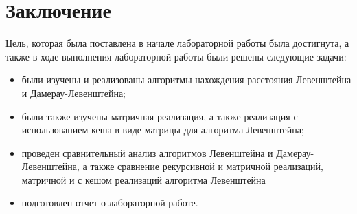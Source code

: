 \chapter*{Заключение}

Цель, которая была поставлена в начале лабораторной работы была достигнута, а также в ходе выполнения лабораторной работы были решены следующие задачи:

\begin{itemize}
	\item были изучены и реализованы алгоритмы нахождения расстояния Левенштейна и Дамерау-Левенштейна;
	\item были также изучены матричная реализация, а также реализация с использованием кеша в виде матрицы для алгоритма Левенштейна;
    \item проведен сравнительный анализ алгоритмов Левенштейна и Дамерау-Левенштейна, а также сравнение рекурсивной и матричной реализаций, матричной и с кешом реализаций алгоритма Левенштейна
	\item подготовлен отчет о лабораторной работе.
\end{itemize}